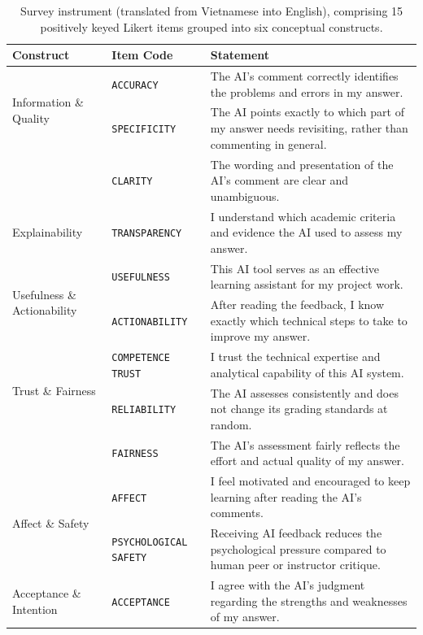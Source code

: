 \documentclass{llncs}
\begin{document}
\begin{table}[t]
\caption{Survey instrument (translated from Vietnamese into English), comprising 15 positively keyed Likert items grouped into six conceptual constructs.}
\label{tab:instrument}
\centering\scriptsize
\renewcommand{\arraystretch}{0.86}
\setlength{\aboverulesep}{1pt}
\setlength{\belowrulesep}{1.2pt}
\setlength\tabcolsep{3pt}
\begin{tabular}{@{}p{19mm}p{25mm}p{72mm}@{}}
\toprule
Construct & Item Code & Statement \\
\midrule
\multirow{2}{19mm}{Information \& Quality}
 & \texttt{ACCURACY} & The AI's comment correctly identifies the problems and errors in my answer. \\
 & \texttt{SPECIFICITY} & The AI points exactly to which part of my answer needs revisiting, rather than commenting in general. \\
 & \texttt{CLARITY} & The wording and presentation of the AI's comment are clear and unambiguous. \\
\midrule
Explainability
 & \texttt{TRANSPARENCY} & I understand which academic criteria and evidence the AI used to assess my answer. \\
\midrule
\multirow{2}{19mm}{Usefulness \& Actionability}
 & \texttt{USEFULNESS} & This AI tool serves as an effective learning assistant for my project work. \\
 & \texttt{ACTIONABILITY} & After reading the feedback, I know exactly which technical steps to take to improve my answer. \\
\midrule
\multirow{2}{19mm}{Trust \& Fairness}
 & \texttt{COMPETENCE TRUST} & I trust the technical expertise and analytical capability of this AI system. \\
 & \texttt{RELIABILITY} & The AI assesses consistently and does not change its grading standards at random. \\
 & \texttt{FAIRNESS} & The AI's assessment fairly reflects the effort and actual quality of my answer. \\
\midrule
\multirow{2}{19mm}{Affect \& Safety}
 & \texttt{AFFECT} & I feel motivated and encouraged to keep learning after reading the AI's comments. \\
 & \texttt{PSYCHOLOGICAL SAFETY} & Receiving AI feedback reduces the psychological pressure compared to human peer or instructor critique. \\
\midrule
\multirow{3}{19mm}{Acceptance \& Intention}
 & \texttt{ACCEPTANCE} & I agree with the AI's judgment regarding the strengths and weaknesses of my answer. \\

\end{tabular}
\end{table}
\end{document}
